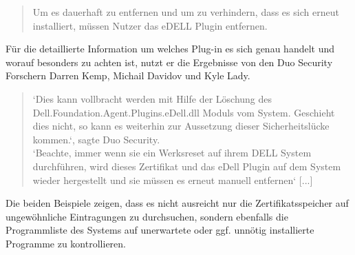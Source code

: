 \begin{quote}
	\glqq Um es dauerhaft zu entfernen und um zu verhindern, dass es sich erneut installiert, müssen Nutzer das eDELL Plugin entfernen.\grqq \cite{zdnet}
\end{quote}
Für die detaillierte Information um welches Plug-in es sich genau handelt und worauf besonders zu achten ist, nutzt er die Ergebnisse von den Duo Security Forschern Darren Kemp, Michail Davidov und Kyle Lady.
\begin{quote}
	\glqq‘Dies kann vollbracht werden mit Hilfe der Löschung des \newline Dell.Foundation.Agent.Plugins.eDell.dll Moduls vom System. Geschieht dies nicht, so kann es weiterhin zur Aussetzung dieser Sicherheitslücke kommen.‘, sagte Duo Security.
	\\
	‘Beachte, immer wenn sie ein Werksreset auf ihrem DELL System durchführen, wird dieses Zertifikat und das eDell Plugin auf dem System wieder hergestellt und sie müssen es erneut manuell entfernen‘ [...]\grqq \cite{zdnet}
\end{quote}
Die beiden Beispiele zeigen, dass es nicht ausreicht nur die Zertifikatsspeicher auf ungewöhnliche Eintragungen zu durchsuchen, sondern ebenfalls die Programmliste des Systems auf unerwartete oder ggf. unnötig installierte Programme zu kontrollieren.
